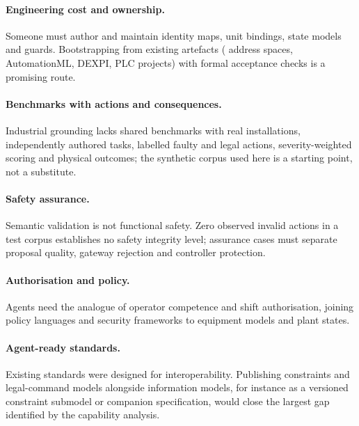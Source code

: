 \paragraph{Engineering cost and ownership.} Someone must author and maintain identity maps,
unit bindings, state models and guards. Bootstrapping from existing artefacts (\opcua{}
address spaces, AutomationML, DEXPI, PLC projects) with formal acceptance checks is a
promising route.

\paragraph{Benchmarks with actions and consequences.} Industrial grounding lacks shared
benchmarks with real installations, independently authored tasks, labelled faulty and
legal actions, severity-weighted scoring and physical outcomes; the synthetic corpus used
here is a starting point, not a substitute.

\paragraph{Safety assurance.} Semantic validation is not functional safety. Zero observed
invalid actions in a test corpus establishes no safety integrity level; assurance cases
must separate proposal quality, gateway rejection and controller protection.

\paragraph{Authorisation and policy.} Agents need the analogue of operator competence and
shift authorisation, joining policy languages and security frameworks
\cite{w3c2018odrl,iec62443} to equipment models and plant states.

\paragraph{Agent-ready standards.} Existing standards were designed for interoperability.
Publishing constraints and legal-command models alongside information models, for instance
as a versioned constraint submodel or companion specification, would close the largest gap
identified by the capability analysis.
